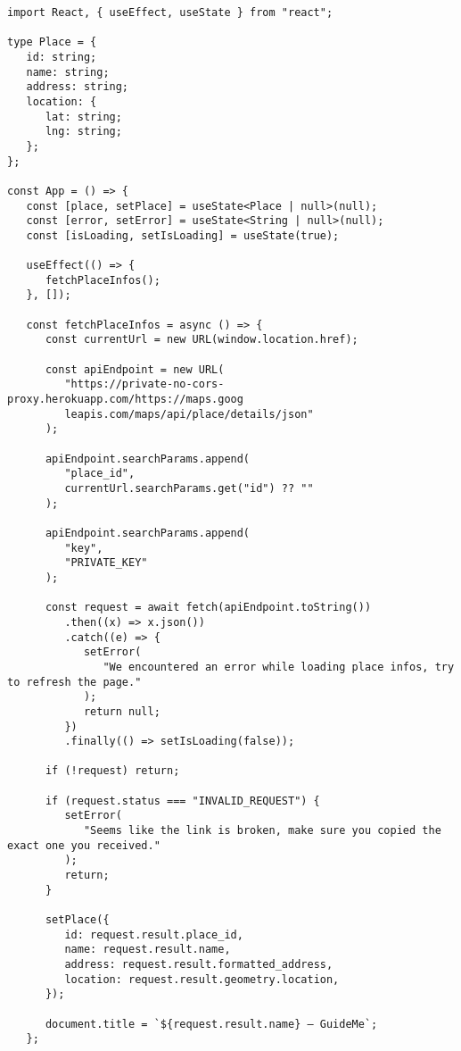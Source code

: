 \begin{code}
\begin{verbatim}
import React, { useEffect, useState } from "react";

type Place = {
   id: string;
   name: string;
   address: string;
   location: {
      lat: string;
      lng: string;
   };
};

const App = () => {
   const [place, setPlace] = useState<Place | null>(null);
   const [error, setError] = useState<String | null>(null);
   const [isLoading, setIsLoading] = useState(true);

   useEffect(() => {
      fetchPlaceInfos();
   }, []);

   const fetchPlaceInfos = async () => {
      const currentUrl = new URL(window.location.href);

      const apiEndpoint = new URL(
         "https://private-no-cors-proxy.herokuapp.com/https://maps.goog
         leapis.com/maps/api/place/details/json"
      );

      apiEndpoint.searchParams.append(
         "place_id",
         currentUrl.searchParams.get("id") ?? ""
      );

      apiEndpoint.searchParams.append(
         "key",
         "PRIVATE_KEY"
      );

      const request = await fetch(apiEndpoint.toString())
         .then((x) => x.json())
         .catch((e) => {
            setError(
               "We encountered an error while loading place infos, try to refresh the page."
            );
            return null;
         })
         .finally(() => setIsLoading(false));

      if (!request) return;

      if (request.status === "INVALID_REQUEST") {
         setError(
            "Seems like the link is broken, make sure you copied the exact one you received."
         );
         return;
      }

      setPlace({
         id: request.result.place_id,
         name: request.result.name,
         address: request.result.formatted_address,
         location: request.result.geometry.location,
      });

      document.title = `${request.result.name} — GuideMe`;
   };


\end{verbatim}
\end{code}
